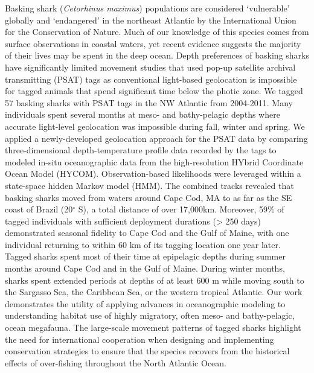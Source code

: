 Basking shark (\textit{Cetorhinus maximus}) populations are considered ‘vulnerable’ globally and ‘endangered’ in the northeast Atlantic by the International Union for the Conservation of Nature. Much of our knowledge of this species comes from surface observations in coastal waters, yet recent evidence suggests the majority of their lives may be spent in the deep ocean. Depth preferences of basking sharks have significantly limited movement studies that used pop-up satellite archival transmitting (PSAT) tags as conventional light-based geolocation is impossible for tagged animals that spend significant time below the photic zone. We tagged 57 basking sharks with PSAT tags in the NW Atlantic from 2004-2011. Many individuals spent several months at meso- and bathy-pelagic depths where accurate light-level geolocation was impossible during fall, winter and spring. We applied a newly-developed geolocation approach for the PSAT data by comparing three-dimensional depth-temperature profile data recorded by the tags to modeled in-situ oceanographic data from the high-resolution HYbrid Coordinate Ocean Model (HYCOM). Observation-based likelihoods were leveraged within a state-space hidden Markov model (HMM). The combined tracks revealed that basking sharks moved from waters around Cape Cod, MA to as far as the SE coast of Brazil (20$^{\circ}$ S), a total distance of over 17,000km. Moreover, 59\% of tagged individuals with sufficient deployment durations (> 250 days) demonstrated seasonal fidelity to Cape Cod and the Gulf of Maine, with one individual returning to within 60 km of its tagging location one year later. Tagged sharks spent most of their time at epipelagic depths during summer months around Cape Cod and in the Gulf of Maine. During winter months, sharks spent extended periods at depths of at least 600 m while moving south to the Sargasso Sea, the Caribbean Sea, or the western tropical Atlantic. Our work demonstrates the utility of applying advances in oceanographic modeling to understanding habitat use of highly migratory, often meso- and bathy-pelagic, ocean megafauna. The large-scale movement patterns of tagged sharks highlight the need for international cooperation when designing and implementing conservation strategies to ensure that the species recovers from the historical effects of over-fishing throughout the North Atlantic Ocean.

